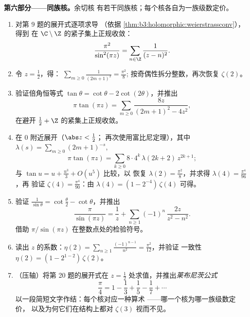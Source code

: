 \begin{problem}
\medskip
\noindent\textbf{第六部分——同族核。}余切核
有若干同族核；每个核各自为一族级数定价。
\begin{enumerate}[resume]
  \item 对第 9 题的展开式逐项求导
        （依据
        \cref{thm:b3:holomorphic:weierstrassconv}），得到
        在 $\C\setminus\Z$ 的紧子集上正规收敛：
        \[
        \frac{\pi^2}{\sin^2(\pi z)} =
        \sum_{n\in\Z}\frac1{(z - n)^2} .
        \]
  \item 令 $z = \frac12$，得：
        $\sum_{m\geq0}\frac1{(2m+1)^2} = \frac{\pi^2}8$;
        按奇偶性拆分整数，再次恢复
        $\zeta(2)$。
  \item 验证倍角恒等式 $\tan\theta =
        \cot\theta - 2\cot(2\theta)$，并推出
        \[
        \pi\tan(\pi z) =
        \sum_{m\geq0}\frac{8z}{(2m+1)^2 - 4z^2} ,
        \]
        在避开 $\frac12 + \Z$ 的紧集上正规收敛。
  \item 在 $0$ 附近展开（$\abs z < \frac12$；
        再次使用富比尼定理），其中 $\lambda(s) =
        \sum_{m\geq0}(2m+1)^{-s}$,
        \[
        \pi\tan(\pi z) =
        \sum_{k\geq0}8\cdot4^k\,\lambda(2k+2)\,z^{2k+1} ;
        \]
        与 $\tan u = u + \frac{u^3}3 + O(u^5)$ 比较，以
        恢复 $\lambda(2) = \frac{\pi^2}8$，并求得
        $\lambda(4) = \frac{\pi^4}{96}$，再
        验证 $\zeta(4) = \frac{\pi^4}{90}$：由 $\lambda(4) = (1 -
        2^{-4})\,\zeta(4)$ 可得。
  \item 验证 $\frac1{\sin\theta} = \cot\frac\theta2 -
        \cot\theta$，并推出
        \[
        \frac{\pi}{\sin(\pi z)} = \frac1z +
        \sum_{n\geq1}(-1)^n\,\frac{2z}{z^2 - n^2} .
        \]
        借助
        $\pi/\sin(\pi z)$ 在整数点处的检验符号。
  \item 读出 $z$ 的系数：$\eta(2) =
        \sum_{n\geq1}\frac{(-1)^{n-1}}{n^2} =
        \frac{\pi^2}{12}$，并验证
        一致性 $\eta(2) = (1 - 2^{1-2})\,\zeta(2)$。
  \item （压轴）将第 20 题的展开式在 $z =
        \frac12$ 处求值，并推出\emph{莱布尼茨公式}
        \[
        \frac\pi4 = 1 - \frac13 + \frac15 - \frac17 +
        \cdots
        \]
        以一段简短文字作结：每个核对应一种算术
——哪一个核为哪一族级数定价，
        以及为何它们在结构上都对
        $\zeta(3)$ 视而不见。


\end{enumerate}
\end{problem}
